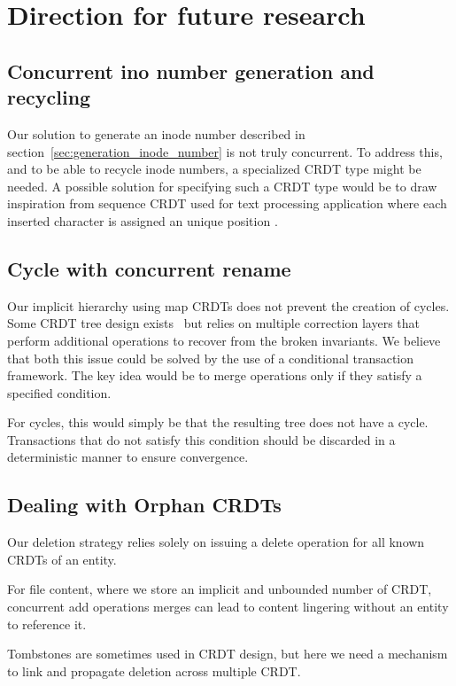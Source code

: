 \documentclass[sigconf, anonymous, 10pt]{acmart}
\begin{document}
\section{Direction for future research}
\label{crdt:future}

\subsection{Concurrent ino number generation and recycling}

Our solution to generate an inode number described in section~\ref{sec:generation_inode_number}
is not truly concurrent.
To address this, and to be able to recycle inode numbers,
a specialized CRDT type might be needed.
A possible solution for specifying such a CRDT type would be to draw inspiration
from sequence CRDT used for text processing application where each inserted
character is assigned an unique position \cite{nedelec2013lseq, letia2009crdts}.

\subsection{Cycle with concurrent rename}

Our implicit hierarchy using map CRDTs does not prevent the creation of cycles.
Some CRDT tree design exists~\cite{martin2012abstract} but relies on multiple correction
layers that perform additional operations to recover from the broken invariants.
We believe that both this issue could be solved by the use of a conditional transaction framework.
The key idea would be to merge operations only if they satisfy a specified condition.

For cycles, this would simply be that the resulting tree does not have a cycle.
Transactions that do not satisfy this condition should be discarded
in a deterministic manner to ensure convergence.

\subsection{Dealing with Orphan CRDTs}

Our deletion strategy relies solely on issuing a delete operation for all
known CRDTs of an entity.

For file content, where we store an implicit and unbounded number of CRDT,
concurrent add operations merges can lead to content lingering
without an entity to reference it.

Tombstones are sometimes used in CRDT design, but here we need a mechanism
to link and propagate deletion across multiple CRDT.
\end{document}

